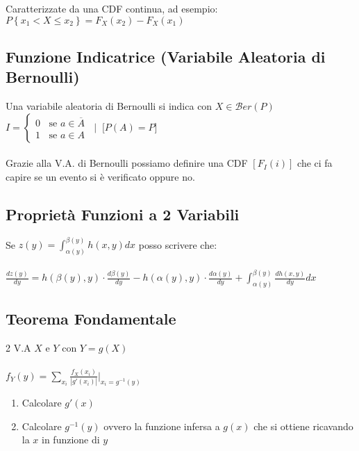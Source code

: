 \documentclass{article}
\begin{document}
Caratterizzate da una CDF continua, ad esempio: $P \left\{ x_1 < X \leq x_2\right\} = F_X(x_2) - F_X(x_1)$

\subsection{Funzione Indicatrice (Variabile Aleatoria di Bernoulli)}

Una variabile aleatoria di Bernoulli si indica con $X \in \mathcal{B}er (P)$ \\
$I = \begin{cases}
0 \;\;\text{ se } a \in \overline A\\
1 \;\;\text{ se } a \in A
\end{cases}
\;\;
\bigg|
\;\;
\big[ P(A) = P\big]$ \\ \\
Grazie alla V.A. di Bernoulli possiamo definire una CDF $\left[ F_I(i) \right]$ che ci fa capire se un evento si è verificato oppure no.

\subsection{Proprietà Funzioni a 2 Variabili}
Se $z(y) = \int_{\alpha(y)}^{\beta(y)} h(x,y) dx$ posso scrivere che: \\
\\
$\frac{dz(y)}{dy} = h \left( \beta(y), y\right) \cdot \frac{d\beta(y)}{dy} - h \left( \alpha(y), y\right) \cdot \frac{d\alpha(y)}{dy} + \int_{\alpha(y)}^{\beta(y)} \frac{dh(x,y)}{dy} dx$

\subsection{Teorema Fondamentale}
2 V.A $X$ e $Y$ con $Y=g(X)$ \\
\\
$f_Y(y) = \sum_{x_i} \frac{f_X(x_i)}{|g'(x_i)|} \Big|_{x_i = g^{-1}(y)}$\\
\begin{enumerate}
    \item Calcolare $g'(x)$
    \item Calcolare $g^{-1}(y)$ ovvero la funzione infersa a $g(x)$ che si ottiene ricavando la $x$ in funzione di $y$
\end{enumerate}
\end{document}

